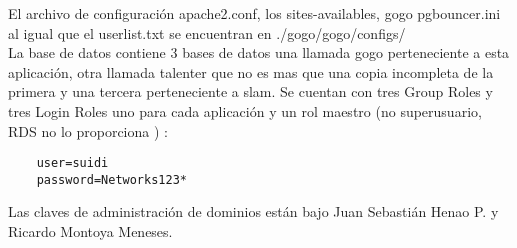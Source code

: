 \documentclass[10pt,a4paper]{book}
\begin{document}
	El archivo de configuración apache2.conf, los sites-availables, gogo pgbouncer.ini al igual que el userlist.txt se encuentran en ./gogo/gogo/configs/ \\
	
	La base de datos contiene 3 bases de datos una llamada gogo perteneciente a esta aplicación, otra llamada talenter que no es mas que una copia incompleta de la primera y una tercera perteneciente a slam. Se cuentan con tres Group Roles y tres Login Roles uno para cada aplicación y un rol maestro (no superusuario, RDS no lo proporciona ) :
	\begin{verbatim}
	user=suidi 
	password=Networks123*
	\end{verbatim}
	
	Las claves de administración de dominios están bajo Juan Sebastián Henao P. y Ricardo Montoya Meneses.
	
\end{document}

